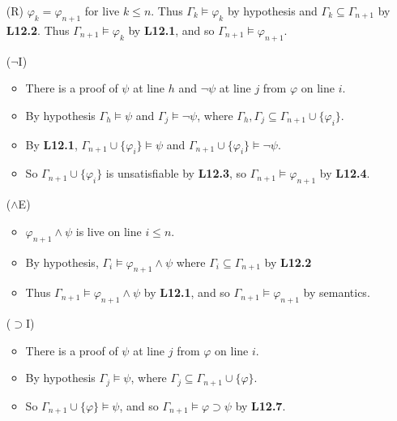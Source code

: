 \documentclass[a4paper, 11pt]{article} %
\newcommand{\set}[1]{\lbrace#1\rbrace} %
\renewcommand{\models}{\vDash}
\def\metaA{\ensuremath{\varphi}}
\def\metaB{\ensuremath{\psi}}
\begin{document}
\begin{enumerate}[labelsep=.1in]
  \item[(R)] $\metaA_k=\metaA_{n+1}$ for live $k\leq n$. Thus $\Gamma_k\models\metaA_k$ by hypothesis and $\Gamma_k\subseteq\Gamma_{n+1}$ by \textbf{L12.2}. Thus $\Gamma_{n+1}\models\metaA_k$ by \textbf{L12.1}, and so $\Gamma_{n+1}\models\metaA_{n+1}$.
  \item[($\neg$I)] %
    \begin{itemize}
      \item There is a proof of $\metaB$ at line $h$ and $\neg\metaB$ at line $j$ from $\metaA$ on line $i$. 
      \item By hypothesis $\Gamma_h\models \metaB$ and $\Gamma_j\models\neg\metaB$, where $\Gamma_h,\Gamma_j\subseteq\Gamma_{n+1}\cup\set{\metaA_i}$.
      \item By \textbf{L12.1}, $\Gamma_{n+1}\cup\set{\metaA_i}\models\metaB$ and $\Gamma_{n+1}\cup\set{\metaA_i}\models\neg\metaB$.
      \item So $\Gamma_{n+1}\cup\set{\metaA_i}$ is unsatisfiable by \textbf{L12.3}, so $\Gamma_{n+1}\models\metaA_{n+1}$ by \textbf{L12.4}.
    \end{itemize}
  \item[($\wedge$E)]
    \begin{itemize}
      \item $\metaA_{n+1}\wedge\metaB$ is live on line $i\leq n$.
      \item By hypothesis, $\Gamma_i\models\metaA_{n+1}\wedge\metaB$ where $\Gamma_i\subseteq\Gamma_{n+1}$ by \textbf{L12.2}
      \item Thus $\Gamma_{n+1}\models\metaA_{n+1}\wedge\psi$ by \textbf{L12.1}, and so $\Gamma_{n+1}\models\metaA_{n+1}$ by semantics.
    \end{itemize}
  \item[($\supset$I)]
    \begin{itemize}
      \item There is a proof of $\metaB$ at line $j$ from $\metaA$ on line $i$. 
      \item By hypothesis $\Gamma_j\models \metaB$, where $\Gamma_j\subseteq\Gamma_{n+1}\cup\set{\metaA}$.
      \item So $\Gamma_{n+1}\cup\set{\metaA}\models\psi$, and so $\Gamma_{n+1}\models\metaA\supset\metaB$ by \textbf{L12.7}.
    \end{itemize}
\end{enumerate}
\end{document}
